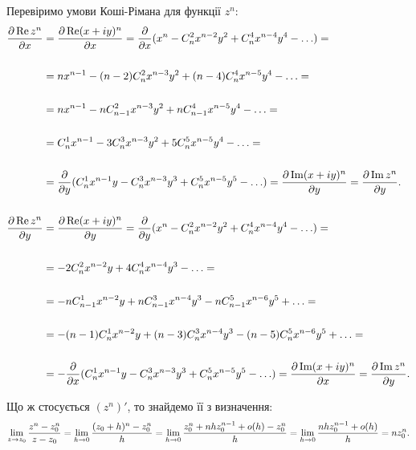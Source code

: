 \begin{solution}
    Перевіримо умови Коші-Рімана для функції $z^n$:
    \begin{align*}
        \dfrac{\partial \operatorname{Re} z^n}{\partial x} &= \dfrac{\partial \operatorname{Re} (x + iy)^n}{\partial x} = \dfrac{\partial}{\partial x} (x^n - C_n^2 x^{n - 2} y^2 + C_n^4 x^{n - 4} y^4 - \ldots) = \\
        \\
        &= n x^{n - 1} - (n - 2) C_n^2 x^{n - 3} y^2 + (n - 4) C_n^4 x^{n - 5} y^4 - \ldots = \\
        \\
        &= n x^{n - 1} - n C_{n - 1}^2 x^{n - 3} y^2 + n C_{n - 1}^4 x^{n - 5} y^4 - \ldots = \\
        \\
        &= C_n^1 x^{n - 1} - 3 C_n^3 x^{n - 3} y^2 + 5 C_n^5 x^{n - 5} y^4 - \ldots = \\
        \\
        &= \dfrac{\partial}{\partial y} (C_n^1 x^{n - 1} y - C_n^3 x^{n - 3} y^3 + C_n^5 x^{n - 5} y^5 - \ldots) = \dfrac{\partial \operatorname{Im} (x + iy)^n}{\partial y} = \dfrac{\partial \operatorname{Im} z^n}{\partial y}. \\
        \\
        \dfrac{\partial \operatorname{Re} z^n}{\partial y} &= \dfrac{\partial \operatorname{Re} (x + iy)^n}{\partial y} = \dfrac{\partial}{\partial y} (x^n - C_n^2 x^{n - 2} y^2 + C_n^4 x^{n - 4} y^4 - \ldots) = \\
        \\
        &= - 2 C_n^2 x^{n - 2} y + 4 C_n^4 x^{n - 4} y^3 - \ldots = \\
        \\
        &= - n C_{n - 1}^1 x^{n - 2} y + n C_{n - 1}^3 x^{n - 4} y^3 - n C_{n - 1}^5 x^{n - 6} y^5 + \ldots = \\
        \\
        &= - (n - 1) C_n^1 x^{n - 2} y + (n - 3) C_n^3 x^{n - 4} y^3 - (n - 5) C_n^5 x^{n - 6} y^5 + \ldots = \\
        \\
        &= - \dfrac{\partial}{\partial x} (C_n^1 x^{n - 1} y - C_n^3 x^{n - 3} y^3 + C_n^5 x^{n - 5} y^5 - \ldots) = \dfrac{\partial \operatorname{Im} (x + iy)^n}{\partial x} = \dfrac{\partial \operatorname{Im} z^n}{\partial y}.
    \end{align*}
    
    Що ж стосується $(z^n)'$, то знайдемо її з визначення: 
    \[ \displaystyle\lim\limits_{z \to z_0} \dfrac{z^n - z_0^n}{z - z_0} = \displaystyle\lim\limits_{h \to 0} \dfrac{(z_0 + h)^n - z_0^n}{h} = \displaystyle\lim\limits_{h \to 0} \dfrac{z_0^n + n h z_0^{n - 1} + o(h) - z_0^n}{h} = \displaystyle\lim\limits_{h\to0} \dfrac{n h z_0^{n - 1} + o(h)}{h} = n z_0^n. \]
    

\end{solution}
